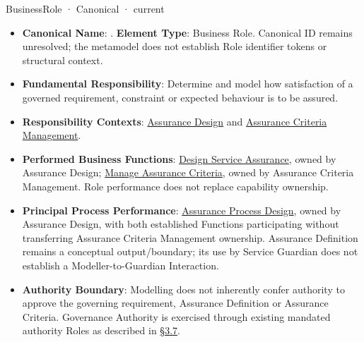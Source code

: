 \label{element:962735ea17a840e5a772f813d3ad7d45}
{\small BusinessRole · Canonical · current}\par

\begin{itemize}


\item \textbf{Canonical Name}: \texttt{}. \textbf{Element Type}: Business Role. Canonical ID remains unresolved; the metamodel does not establish Role identifier tokens or structural context.

\item \textbf{Fundamental Responsibility}: Determine and model how satisfaction of a governed requirement, constraint or expected behaviour is to be assured.

\item \textbf{Responsibility Contexts}: \href{\detokenize{../../../../../docs/markdown/02-strategy/capabilities/business-enabling-capabilities.md#assurance-design}}{Assurance Design} and \href{\detokenize{../../../../../docs/markdown/02-strategy/capabilities/business-enabling-capabilities.md#assurance-criteria-management}}{Assurance Criteria Management}.

\item \textbf{Performed Business Functions}: \href{\detokenize{../../../../../docs/markdown/03-business-architecture/behaviours/health-service-assurance.md#design-service-assurance}}{Design Service Assurance}, owned by Assurance Design; \href{\detokenize{../../../../../docs/markdown/03-business-architecture/behaviours/health-service-assurance.md#manage-assurance-criteria}}{Manage Assurance Criteria}, owned by Assurance Criteria Management. Role performance does not replace capability ownership.

\item \textbf{Principal Process Performance}: \href{\detokenize{../../../../../docs/markdown/03-business-architecture/processes/business-processes.md#assurance-process-design}}{Assurance Process Design}, owned by Assurance Design, with both established Functions participating without transferring Assurance Criteria Management ownership. Assurance Definition remains a conceptual output/boundary; its use by Service Guardian does not establish a Modeller-to-Guardian Interaction.

\item \textbf{Authority Boundary}: Modelling does not inherently confer authority to approve the governing requirement, Assurance Definition or Assurance Criteria. Governance Authority is exercised through existing mandated authority Roles as described in \href{\detokenize{../../../../../docs/markdown/03-business-architecture/actors-roles/roles.md#37-governance-authority-and-assurance-modelling}}{§3.7}.


\end{itemize}

